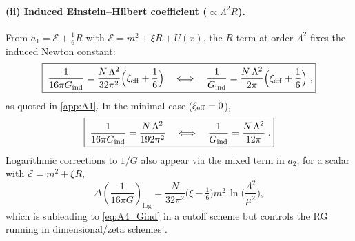 \documentclass{iopjournal}
\begin{document}
\paragraph{(ii) Induced Einstein--Hilbert coefficient ($\propto \Lambda^2 R$).}
From $a_1=\mathcal{E}+\tfrac{1}{6}R$ with $\mathcal{E}=m^2+\xi R+U(x)$, the $R$ term at order $\Lambda^2$ fixes the induced Newton constant:
\begin{equation}
\boxed{\;
\frac{1}{16\pi G_{\rm ind}}=\frac{N\,\Lambda^2}{32\pi^2}\Big(\xi_{\rm eff}+\frac{1}{6}\Big)
\quad\Longleftrightarrow\quad
\frac{1}{G_{\rm ind}}=\frac{N\,\Lambda^2}{2\pi}\Big(\xi_{\rm eff}+\frac{1}{6}\Big)\;,
}
\label{eq:A4_Gind}
\end{equation}
as quoted in \cref{app:A1}. In the minimal case ($\xi_{\rm eff}=0$),
\begin{equation}
\boxed{\;
\frac{1}{16\pi G_{\rm ind}}=\frac{N\,\Lambda^2}{192\pi^2}
\quad\Longleftrightarrow\quad
\frac{1}{G_{\rm ind}}=\frac{N\,\Lambda^2}{12\pi}\;.
}
\label{eq:A4_Gind_min}
\end{equation}
Logarithmic corrections to $1/G$ also appear via the mixed term in $a_2$; for a scalar with $\mathcal{E}=m^2+\xi R$,
\begin{equation}
\Delta\!\left(\frac{1}{16\pi G}\right)_{\!\log}
=\frac{N}{32\pi^2}\Big(\xi-\tfrac{1}{6}\Big)m^2\,
\ln\!\Big(\frac{\Lambda^2}{\mu^2}\Big),
\label{eq:A4_logG}
\end{equation}
which is subleading to \eqref{eq:A4_Gind} in a cutoff scheme but controls the RG running in dimensional/zeta schemes \cite{ParkerToms,Vassilevich2003}.
\end{document}
